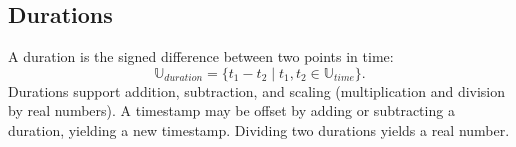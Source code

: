 \subsection{Durations}

A duration is the signed difference between two points in time:
\[
\mathbb{U}_{duration} = \{ t_1 - t_2 \mid t_1, t_2 \in \mathbb{U}_{time} \}.
\]
Durations support addition, subtraction, and scaling (multiplication and division by real numbers). A timestamp may be offset by adding or subtracting a duration, yielding a new timestamp. Dividing two durations yields a real number.
